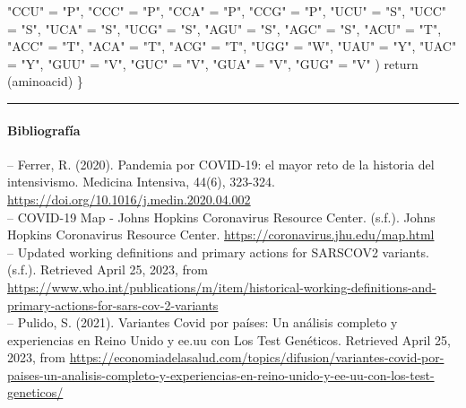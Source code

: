 \documentclass[
]{article}
\newenvironment{Shaded}{\begin{snugshade}}{\end{snugshade}}
\newcommand{\FunctionTok}[1]{\textcolor[rgb]{0.00,0.00,0.00}{#1}}
\newcommand{\NormalTok}[1]{#1}
\newcommand{\OtherTok}[1]{\textcolor[rgb]{0.56,0.35,0.01}{#1}}
\newcommand{\StringTok}[1]{\textcolor[rgb]{0.31,0.60,0.02}{#1}}
\begin{document}
\begin{Shaded}
\begin{Highlighting}[]
    \StringTok{"CCU"} \OtherTok{=} \StringTok{"P"}\NormalTok{, }\StringTok{"CCC"} \OtherTok{=} \StringTok{"P"}\NormalTok{, }\StringTok{"CCA"} \OtherTok{=} \StringTok{"P"}\NormalTok{, }\StringTok{"CCG"} \OtherTok{=} \StringTok{"P"}\NormalTok{,}
    \StringTok{"UCU"} \OtherTok{=} \StringTok{"S"}\NormalTok{, }\StringTok{"UCC"} \OtherTok{=} \StringTok{"S"}\NormalTok{, }\StringTok{"UCA"} \OtherTok{=} \StringTok{"S"}\NormalTok{, }\StringTok{"UCG"} \OtherTok{=} \StringTok{"S"}\NormalTok{,}
    \StringTok{"AGU"} \OtherTok{=} \StringTok{"S"}\NormalTok{, }\StringTok{"AGC"} \OtherTok{=} \StringTok{"S"}\NormalTok{, }\StringTok{"ACU"} \OtherTok{=} \StringTok{"T"}\NormalTok{, }\StringTok{"ACC"} \OtherTok{=} \StringTok{"T"}\NormalTok{,}
    \StringTok{"ACA"} \OtherTok{=} \StringTok{"T"}\NormalTok{, }\StringTok{"ACG"} \OtherTok{=} \StringTok{"T"}\NormalTok{, }\StringTok{"UGG"} \OtherTok{=} \StringTok{"W"}\NormalTok{, }\StringTok{"UAU"} \OtherTok{=} \StringTok{"Y"}\NormalTok{,}
    \StringTok{"UAC"} \OtherTok{=} \StringTok{"Y"}\NormalTok{, }\StringTok{"GUU"} \OtherTok{=} \StringTok{"V"}\NormalTok{, }\StringTok{"GUC"} \OtherTok{=} \StringTok{"V"}\NormalTok{, }\StringTok{"GUA"} \OtherTok{=} \StringTok{"V"}\NormalTok{,}
    \StringTok{"GUG"} \OtherTok{=} \StringTok{"V"}
\NormalTok{  )}
  \FunctionTok{return}\NormalTok{ (aminoacid)}
\NormalTok{\}}
\end{Highlighting}
\end{Shaded}

\begin{center}\rule{0.5\linewidth}{0.5pt}\end{center}

\hypertarget{bibliografuxeda}{%
\paragraph{Bibliografía}\label{bibliografuxeda}}

-- Ferrer, R. (2020). Pandemia por COVID-19: el mayor reto de la
historia del intensivismo. Medicina Intensiva, 44(6), 323-324.
\url{https://doi.org/10.1016/j.medin.2020.04.002}\\
-- COVID-19 Map - Johns Hopkins Coronavirus Resource Center. (s.f.).
Johns Hopkins Coronavirus Resource Center.
\url{https://coronavirus.jhu.edu/map.html}\\
-- Updated working definitions and primary actions for SARSCOV2
variants. (s.f.). Retrieved April 25, 2023, from
\url{https://www.who.int/publications/m/item/historical-working-definitions-and-primary-actions-for-sars-cov-2-variants}\\
-- Pulido, S. (2021). Variantes Covid por países: Un análisis completo y
experiencias en Reino Unido y ee.uu con Los Test Genéticos. Retrieved
April 25, 2023, from
\url{https://economiadelasalud.com/topics/difusion/variantes-covid-por-paises-un-analisis-completo-y-experiencias-en-reino-unido-y-ee-uu-con-los-test-geneticos/}
\end{document}

